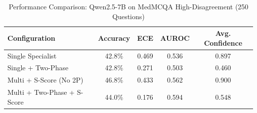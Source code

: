 \begin{table}[h]
\centering
\caption{Performance Comparison: Qwen2.5-7B on MedMCQA High-Disagreement (250 Questions)}
\label{tab:medmcqa250_results}
\begin{tabular}{lcccc}
\hline
Configuration & Accuracy & ECE & AUROC & Avg. Confidence \\
\hline
Single Specialist & 42.8\% & 0.469 & 0.536 & 0.897 \\
Single + Two-Phase & 42.8\% & 0.271 & 0.503 & 0.460 \\
Multi + S-Score (No 2P) & 46.8\% & 0.433 & 0.562 & 0.900 \\
Multi + Two-Phase + S-Score & 44.0\% & 0.176 & 0.594 & 0.548 \\
\hline
\end{tabular}
\end{table}